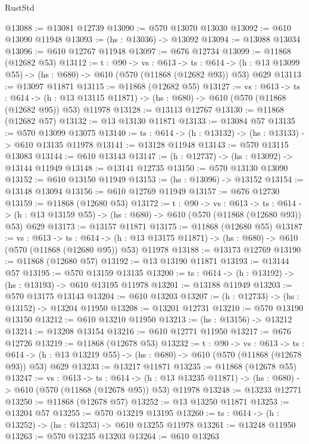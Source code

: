 \begin{lexlean}{RustStd}
\begin{coremodule}
@13088 := @13081 @12739
@13090 := @570 @13070 @13030
@13092 := @610 @13090 @11948
@13093 := (hs : @13036) -> @13092
@13094 := @13088 @13034
@13096 := @610 @12767 @11948
@13097 := @676 @12734
@13099 := @11868 (@12682 @53)
@13112 := {t : @90} ->
  {vs : @613} ->
  {ts : @614} -> (h : @13 @13099 @55) -> (hs : @680) -> @610 (@570 (@11868 (@12682 @93)) @53) @629
@13113 := @13097 @11871
@13115 := @11868 (@12682 @55)
@13127 := {vs : @613} ->
  {ts : @614} ->
  (h : @13 @13115 @11871) -> (hs : @680) -> @610 (@570 (@11868 (@12682 @95)) @53) @11978
@13128 := @13113 @12767
@13130 := @11868 (@12682 @57)
@13132 := @13 @13130 @11871
@13133 := @13084 @57
@13135 := @570 @13099 @13075
@13140 := {ts : @614} -> (h : @13132) -> (hs : @13133) -> @610 @13135 @11978
@13141 := @13128 @11948
@13143 := @570 @13115 @13083
@13144 := @610 @13143
@13147 := (h : @12737) -> (hs : @13092) -> @13144 @11949
@13148 := @13141 @12735
@13150 := @570 @13130 @13090
@13152 := @610 @13150 @11949
@13153 := (hs : @13096) -> @13152
@13154 := @13148 @13094
@13156 := @610 @12769 @11949
@13157 := @676 @12730
@13159 := @11868 (@12680 @53)
@13172 := {t : @90} ->
  {vs : @613} ->
  {ts : @614} -> (h : @13 @13159 @55) -> (hs : @680) -> @610 (@570 (@11868 (@12680 @93)) @53) @629
@13173 := @13157 @11871
@13175 := @11868 (@12680 @55)
@13187 := {vs : @613} ->
  {ts : @614} ->
  (h : @13 @13175 @11871) -> (hs : @680) -> @610 (@570 (@11868 (@12680 @95)) @53) @11978
@13188 := @13173 @12769
@13190 := @11868 (@12680 @57)
@13192 := @13 @13190 @11871
@13193 := @13144 @57
@13195 := @570 @13159 @13135
@13200 := {ts : @614} -> (h : @13192) -> (hs : @13193) -> @610 @13195 @11978
@13201 := @13188 @11949
@13203 := @570 @13175 @13143
@13204 := @610 @13203
@13207 := (h : @12733) -> (hs : @13152) -> @13204 @11950
@13208 := @13201 @12731
@13210 := @570 @13190 @13150
@13212 := @610 @13210 @11950
@13213 := (hs : @13156) -> @13212
@13214 := @13208 @13154
@13216 := @610 @12771 @11950
@13217 := @676 @12726
@13219 := @11868 (@12678 @53)
@13232 := {t : @90} ->
  {vs : @613} ->
  {ts : @614} -> (h : @13 @13219 @55) -> (hs : @680) -> @610 (@570 (@11868 (@12678 @93)) @53) @629
@13233 := @13217 @11871
@13235 := @11868 (@12678 @55)
@13247 := {vs : @613} ->
  {ts : @614} ->
  (h : @13 @13235 @11871) -> (hs : @680) -> @610 (@570 (@11868 (@12678 @95)) @53) @11978
@13248 := @13233 @12771
@13250 := @11868 (@12678 @57)
@13252 := @13 @13250 @11871
@13253 := @13204 @57
@13255 := @570 @13219 @13195
@13260 := {ts : @614} -> (h : @13252) -> (hs : @13253) -> @610 @13255 @11978
@13261 := @13248 @11950
@13263 := @570 @13235 @13203
@13264 := @610 @13263

\end{coremodule}
\end{lexlean}
